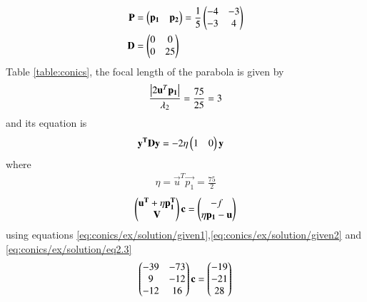 \begin{enumerate}
\begin{align}
\mathbf{P}&=\begin{pmatrix}\mathbf{p_1}&\mathbf{p_2}\end{pmatrix}=\frac{1}{5}\begin{pmatrix}-4&-3\\ -3 &4\end{pmatrix} \\
\mathbf{D}&=\begin{pmatrix}0&0\\0&25\end{pmatrix}
\end{align}
Table \ref{table:conics}, the focal length of the parabola is given by 
\begin{align}
\frac{\left\vert2\mathbf{u}^T\mathbf{p_1}\right\vert}{\lambda_2}
    = \frac{75}{25}=3
\end{align}
and its equation is
\begin{align}
    \mathbf{y^T}\mathbf{D}\mathbf{y}&=-2\eta\begin{pmatrix}1&0\end{pmatrix}\mathbf{y}\label{eq:conics/ex/solution/eq2.4}
\end{align}
where
\begin{align}
    \eta=\vec{u}^T\vec{p_1}=\frac{75}{2}
\end{align}
\begin{align}
    \begin{pmatrix}\mathbf{u^T}+\eta\mathbf{p_1^T} \\ \mathbf{V}\end{pmatrix}\mathbf{c}=
    \begin{pmatrix}-f \\ \eta\mathbf{p_1}-\mathbf{u}\end{pmatrix} 
\end{align}
using equations \eqref{eq:conics/ex/solution/given1},\eqref{eq:conics/ex/solution/given2} and \eqref{eq:conics/ex/solution/eq2.3}
\begin{align}
    \myvec{-39& -73 \\ 9 & -12 \\  -12 & 16 }\vec{c}=\myvec{-19 \\ -21\\ 28} \label{eq:conics/ex/solution/eqcen}

\end{align}
\end{enumerate}
